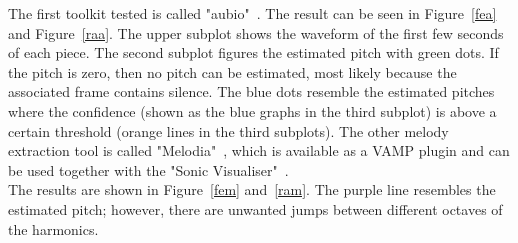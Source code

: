 \noindent The first toolkit tested is called "aubio"~\cite{aubio1}. The result can be seen in Figure~\ref{fea} and Figure~\ref{raa}. The upper subplot shows the waveform of the first few seconds of each piece. The second subplot figures the estimated pitch with green dots. If the pitch is zero, then no pitch can be estimated, most likely because the associated frame contains silence. The blue dots resemble the estimated pitches where the confidence (shown as the blue graphs in the third subplot) is above a certain threshold (orange lines in the third subplots).
\noindent The other melody extraction tool is called "Melodia"~\cite{melodia1}, which is available as a VAMP plugin and can be used together with the "Sonic Visualiser"~\cite{sonviz1}.\\
The results are shown in Figure~\ref{fem} and~\ref{ram}.
The purple line resembles the estimated pitch; however, there are unwanted jumps between different octaves of the harmonics. 

